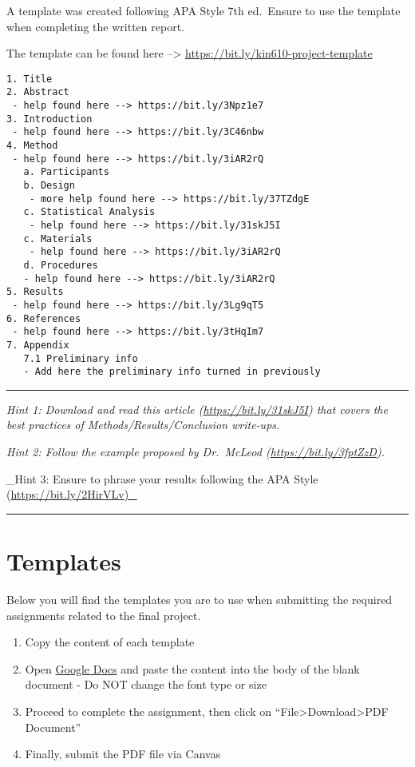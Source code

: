 \documentclass[
]{article}
\providecommand{\tightlist}{%
  \setlength{\itemsep}{0pt}\setlength{\parskip}{0pt}}
\begin{document}
A template was created following APA Style 7th ed.~Ensure to use the template when completing the written report.

The template can be found here --\textgreater{} \url{https://bit.ly/kin610-project-template}

\begin{verbatim}
1. Title
2. Abstract
 - help found here --> https://bit.ly/3Npz1e7
3. Introduction
 - help found here --> https://bit.ly/3C46nbw
4. Method 
 - help found here --> https://bit.ly/3iAR2rQ
   a. Participants
   b. Design
    - more help found here --> https://bit.ly/37TZdgE
   c. Statistical Analysis
    - help found here --> https://bit.ly/31skJ5I 
   c. Materials
    - help found here --> https://bit.ly/3iAR2rQ
   d. Procedures
   - help found here --> https://bit.ly/3iAR2rQ
5. Results
 - help found here --> https://bit.ly/3Lg9qT5
6. References
 - help found here --> https://bit.ly/3tHqIm7
7. Appendix
   7.1 Preliminary info
   - Add here the preliminary info turned in previously
\end{verbatim}

\begin{center}\rule{0.5\linewidth}{0.5pt}\end{center}

\emph{Hint 1: Download and read this article (\url{https://bit.ly/31skJ5I}) that covers the best practices of Methods/Results/Conclusion write-ups.}

\emph{Hint 2: Follow the example proposed by Dr.~McLeod (\url{https://bit.ly/3fptZzD}).}

\_Hint 3: Ensure to phrase your results following the APA Style (\url{https://bit.ly/2HirVLv)_}

\begin{center}\rule{0.5\linewidth}{0.5pt}\end{center}

\hypertarget{templates}{%
\section{Templates}\label{templates}}

Below you will find the templates you are to use when submitting the required assignments related to the final project.

\begin{enumerate}
\def\labelenumi{\arabic{enumi}.}
\tightlist
\item
  Copy the content of each template
\item
  Open \href{http://docs.google.com}{Google Docs} and paste the content into the body of the blank document - Do NOT change the font type or size
\item
  Proceed to complete the assignment, then click on ``File\textgreater Download\textgreater PDF Document''
\item
  Finally, submit the PDF file via Canvas
\end{enumerate}
\end{document}
